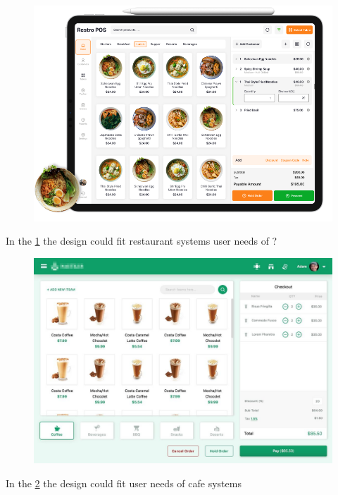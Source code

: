 \documentclass{article}
\begin{document}
\begin{figure}[H]
    \centering
    \includegraphics[width=0.9\linewidth]{HCI/images/restaurant_UI_2.png}
    \caption{}
    \label{fig:restUI2}
\end{figure}
\noindent
In the \cref{fig:restUI2} the design could fit restaurant systems user needs of ?

\begin{figure}[H]
    \centering
    \includegraphics[width=0.9\linewidth]{HCI/images/restaurant_UI_3.jpg}
    \caption{}
    \label{fig:cafeUI}
\end{figure}
 \noindent
 In the \cref{fig:cafeUI} the design could fit user needs of cafe systems
\end{document}
